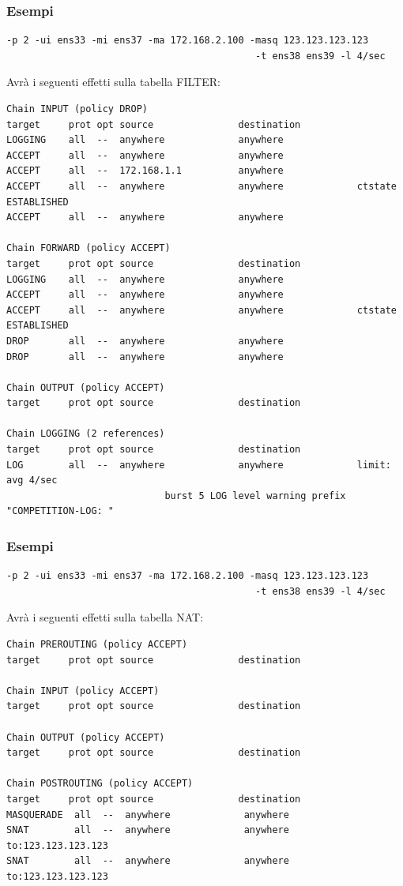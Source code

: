 \documentclass{beamer}
\begin{document}
\begin{frame}[fragile]
    \frametitle{Esempi}
    \begin{lstlisting}
-p 2 -ui ens33 -mi ens37 -ma 172.168.2.100 -masq 123.123.123.123
                                            -t ens38 ens39 -l 4/sec
    \end{lstlisting}
    Avrà i seguenti effetti sulla tabella FILTER:
    \begin{lstlisting}
Chain INPUT (policy DROP)
target     prot opt source               destination         
LOGGING    all  --  anywhere             anywhere            
ACCEPT     all  --  anywhere             anywhere            
ACCEPT     all  --  172.168.1.1          anywhere            
ACCEPT     all  --  anywhere             anywhere             ctstate ESTABLISHED
ACCEPT     all  --  anywhere             anywhere            

Chain FORWARD (policy ACCEPT)
target     prot opt source               destination         
LOGGING    all  --  anywhere             anywhere            
ACCEPT     all  --  anywhere             anywhere            
ACCEPT     all  --  anywhere             anywhere             ctstate ESTABLISHED
DROP       all  --  anywhere             anywhere            
DROP       all  --  anywhere             anywhere            

Chain OUTPUT (policy ACCEPT)
target     prot opt source               destination         

Chain LOGGING (2 references)
target     prot opt source               destination         
LOG        all  --  anywhere             anywhere             limit: avg 4/sec 
                            burst 5 LOG level warning prefix "COMPETITION-LOG: "
    \end{lstlisting}
\end{frame}

\begin{frame}[fragile]
    \frametitle{Esempi}
    \begin{lstlisting}
-p 2 -ui ens33 -mi ens37 -ma 172.168.2.100 -masq 123.123.123.123
                                            -t ens38 ens39 -l 4/sec

    \end{lstlisting}
    Avrà i seguenti effetti sulla tabella NAT:
    \begin{lstlisting}
Chain PREROUTING (policy ACCEPT)
target     prot opt source               destination         

Chain INPUT (policy ACCEPT)
target     prot opt source               destination         

Chain OUTPUT (policy ACCEPT)
target     prot opt source               destination         

Chain POSTROUTING (policy ACCEPT)
target     prot opt source               destination         
MASQUERADE  all  --  anywhere             anywhere            
SNAT        all  --  anywhere             anywhere             to:123.123.123.123
SNAT        all  --  anywhere             anywhere             to:123.123.123.123
    \end{lstlisting}
\end{frame}
\end{document}
